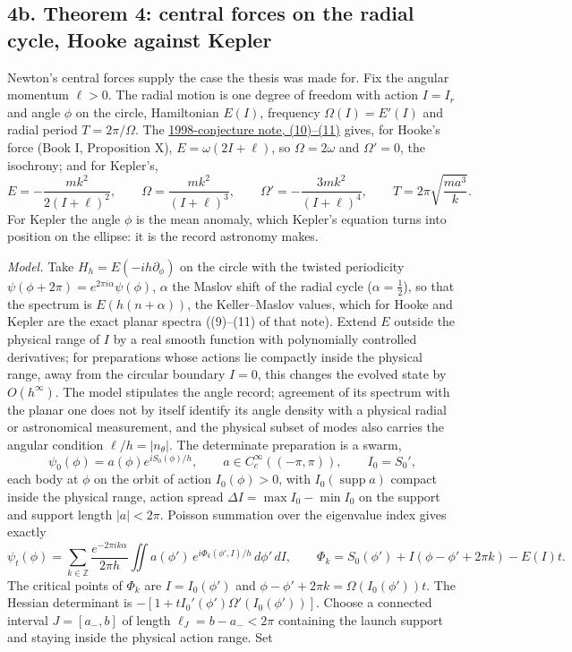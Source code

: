 \documentclass[11pt,a4paper]{article}
\begin{document}
\hypertarget{b.-theorem-4-central-forces-on-the-radial-cycle-hooke-against-kepler}{%
\subsection{4b. Theorem 4: central forces on the radial cycle, Hooke
against
Kepler}\label{b.-theorem-4-central-forces-on-the-radial-cycle-hooke-against-kepler}}

Newton's central forces supply the case the thesis was made for. Fix the
angular momentum \(\ell>0\). The radial motion is one degree of freedom
with action \(I=I_r\) and angle \(\phi\) on the circle, Hamiltonian
\(E(I)\), frequency \(\Omega(I)=E'(I)\) and radial period
\(T=2\pi/\Omega\). The
\href{rivero-1998-conjecture-central-forces.md}{1998-conjecture note,
(10)--(11)} gives, for Hooke's force (Book I, Proposition X),
\(E=\omega(2I+\ell)\), so \(\Omega=2\omega\) and \(\Omega'=0\), the
isochrony; and for Kepler's, \[E=-\frac{mk^2}{2(I+\ell)^2},\qquad
\Omega=\frac{mk^2}{(I+\ell)^3},\qquad
\Omega'=-\frac{3mk^2}{(I+\ell)^4},\qquad
T=2\pi\sqrt{\frac{ma^3}{k}}.\tag{8}\] For Kepler the angle \(\phi\) is
the mean anomaly, which Kepler's equation turns into position on the
ellipse: it is the record astronomy makes.

\emph{Model.} Take \(H_h=E(-ih\partial_\phi)\) on the circle with the
twisted periodicity \(\psi(\phi+2\pi)=e^{2\pi i\alpha}\psi(\phi)\),
\(\alpha\) the Maslov shift of the radial cycle (\(\alpha=\tfrac12\)),
so that the spectrum is \(E(h(n+\alpha))\), the Keller--Maslov values,
which for Hooke and Kepler are the exact planar spectra ((9)--(11) of
that note). Extend \(E\) outside the physical range of \(I\) by a real
smooth function with polynomially controlled derivatives; for
preparations whose actions lie compactly inside the physical range, away
from the circular boundary \(I=0\), this changes the evolved state by
\(O(h^\infty)\). The model stipulates the angle record; agreement of its
spectrum with the planar one does not by itself identify its angle
density with a physical radial or astronomical measurement, and the
physical subset of modes also carries the angular condition
\(\ell/h=|n_\theta|\). The determinate preparation is a swarm,
\[\psi_0(\phi)=a(\phi)e^{iS_0(\phi)/h},\qquad
a\in C_c^\infty((-\pi,\pi)),\qquad I_0=S_0',\tag{9}\] each body at
\(\phi\) on the orbit of action \(I_0(\phi)>0\), with
\(I_0(\operatorname{supp}a)\) compact inside the physical range, action
spread \(\Delta I=\max I_0-\min I_0\) on the support and support length
\(|a|<2\pi\). Poisson summation over the eigenvalue index gives exactly
\[\psi_t(\phi)=\sum_{k\in\mathbb Z}\frac{e^{-2\pi ik\alpha}}{2\pi h}
\iint a(\phi')\,e^{i\Phi_k(\phi',I)/h}\,d\phi'\,dI,\qquad
\Phi_k=S_0(\phi')+I(\phi-\phi'+2\pi k)-E(I)t.\tag{10}\] The critical
points of \(\Phi_k\) are \(I=I_0(\phi')\) and
\(\phi-\phi'+2\pi k=\Omega(I_0(\phi'))t\). The Hessian determinant is
\(-[1+tI_0'(\phi')\Omega'(I_0(\phi'))]\). Choose a connected interval
\(J=[a_-,b]\) of length \(\ell_J=b-a_-<2\pi\) containing the launch
support and staying inside the physical action range. Set
\end{document}
